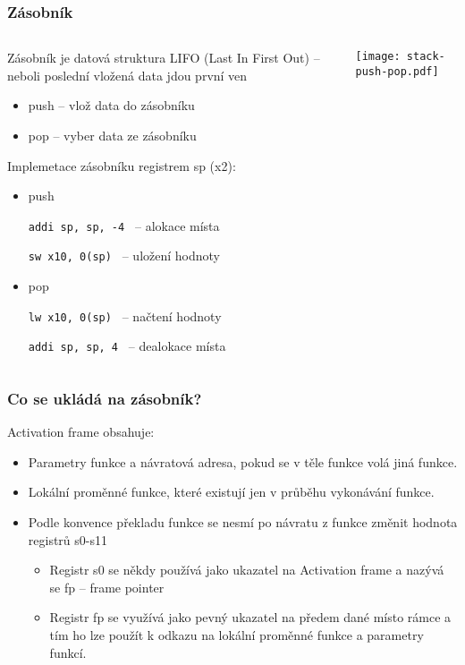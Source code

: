 \documentclass{beamer}
\begin{document}
\begin{frame}
\frametitle{Zásobník}

\begin{columns}
\begin{column}{0.7\textwidth}
Zásobník je datová struktura LIFO (Last In First Out) -- neboli poslední vložená data jdou první ven
\begin{itemize}
 \item push -- vlož data do zásobníku
 \item pop -- vyber data ze zásobníku
\end{itemize}

Implemetace zásobníku registrem sp (x2):
\begin{itemize}
 \item push 
 
\texttt{addi sp, sp, -4 \phantom{xx}}  -- alokace místa

\texttt{sw \phantom{xx}x10, 0(sp) \phantom{xx}}  -- uložení hodnoty
 
 \item pop

\texttt{lw \phantom{xx}x10, 0(sp) \phantom{xx}}  -- načtení hodnoty

\texttt{addi sp, sp, 4 \phantom{xxx}}  -- dealokace místa

\end{itemize}

\end{column}
\hfill
\begin{column}{0.3\textwidth}  
\texttt{[image: stack-push-pop.pdf]}
\end{column}
\end{columns}

\end{frame}

\begin{frame}
\frametitle{Co se ukládá na zásobník?}

Activation frame obsahuje:
\begin{itemize}
 \item Parametry funkce a návratová adresa, pokud se v těle funkce volá jiná funkce.
 \item Lokální proměnné funkce, které existují jen v průběhu vykonávání funkce.
 \item Podle konvence překladu funkce se nesmí po návratu z funkce změnit hodnota registrů s0-s11
\begin{itemize}
 \item Registr s0 se někdy používá jako ukazatel na Activation frame a nazývá se fp -- frame pointer
 \item Registr fp se využívá jako pevný ukazatel na předem dané místo rámce a tím ho lze použít k odkazu na lokální proměnné funkce a parametry funkcí.
\end{itemize}
\end{itemize}
\end{frame}
\end{document}

